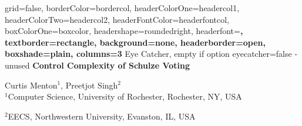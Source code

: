 \documentclass[a0paper,portrait]{baposter}
\begin{document}


\begin{poster}{
	grid=false,
	borderColor=bordercol,
	headerColorOne=headercol1,
	headerColorTwo=headercol2,
	headerFontColor=headerfontcol,
	boxColorOne=boxcolor,
	headershape=roundedright,
	headerfont=\Large\sf\bf,
	textborder=rectangle,
	background=none,
	headerborder=open,
  boxshade=plain,
	columns=3
}
{
	Eye Catcher, empty if option eyecatcher=false - unused
}
{\sf\bf
	Control Complexity of Schulze Voting
}
{
	 Curtis Menton$^{1}$, Preetjot Singh$^{2}$\\
	 \scriptsize
	 $^1${Computer Science, University of Rochester, Rochester, NY, USA}
        \par
        $^2${EECS, Northwestern University, Evanston, IL, USA }
}
{
\setlength\fboxsep{0pt}
\setlength\fboxrule{0pt}
}


\end{poster}
\end{document}

